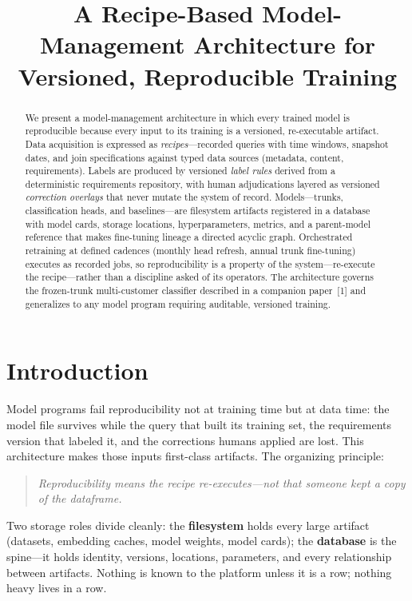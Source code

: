 \documentclass[conference]{IEEEtran}
\title{A Recipe-Based Model-Management Architecture for Versioned, Reproducible Training}
\author{
\IEEEauthorblockN{Johnny~Morgan}
\IEEEauthorblockA{Information Systems, UMBC\\
yj07538@umbc.edu}
}
\begin{document}
\maketitle

\begin{abstract}
We present a model-management architecture in which every trained model is reproducible because every input to its training is a versioned, re-executable artifact. Data acquisition is expressed as \emph{recipes}---recorded queries with time windows, snapshot dates, and join specifications against typed data sources (metadata, content, requirements). Labels are produced by versioned \emph{label rules} derived from a deterministic requirements repository, with human adjudications layered as versioned \emph{correction overlays} that never mutate the system of record. Models---trunks, classification heads, and baselines---are filesystem artifacts registered in a database with model cards, storage locations, hyperparameters, metrics, and a parent-model reference that makes fine-tuning lineage a directed acyclic graph. Orchestrated retraining at defined cadences (monthly head refresh, annual trunk fine-tuning) executes as recorded jobs, so reproducibility is a property of the system---re-execute the recipe---rather than a discipline asked of its operators. The architecture governs the frozen-trunk multi-customer classifier described in a companion paper~[1] and generalizes to any model program requiring auditable, versioned training.
\end{abstract}

\section{Introduction}
Model programs fail reproducibility not at training time but at data time: the model file survives while the query that built its training set, the requirements version that labeled it, and the corrections humans applied are lost. This architecture makes those inputs first-class artifacts. The organizing principle:

\begin{quote}
\emph{Reproducibility means the recipe re-executes---not that someone kept a copy of the dataframe.}
\end{quote}

Two storage roles divide cleanly: the \textbf{filesystem} holds every large artifact (datasets, embedding caches, model weights, model cards); the \textbf{database} is the spine---it holds identity, versions, locations, parameters, and every relationship between artifacts. Nothing is known to the platform unless it is a row; nothing heavy lives in a row.
\end{document}
